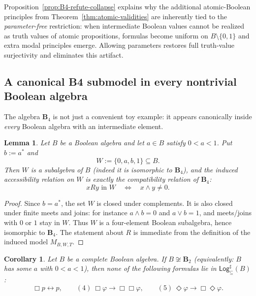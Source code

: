 \documentclass[11pt]{amsart}
\theoremstyle{definition}
\theoremstyle{plain}
\newtheorem{lemma}[definition]{Lemma}
\newtheorem{corollary}[definition]{Corollary}
\newcommand{\Btwo}{\mathbf{B}_2}
\newcommand{\Bfour}{\mathbf{B}_4}
\newcommand{\Logsub}{\mathsf{Log}_{\subseteq}^{\sharp}}
\begin{document}
Proposition~\ref{prop:B4-refute-collapse} explains why the additional atomic-Boolean principles from
Theorem~\ref{thm:atomic-validities} are inherently tied to the \emph{parameter-free} restriction:
when intermediate Boolean values cannot be realized as truth values of atomic propositions, formulas
become uniform on $B\setminus\{0,1\}$ and extra modal principles emerge. Allowing parameters restores
full truth-value surjectivity and eliminates this artifact.

\subsection{A canonical B4 submodel in every nontrivial Boolean algebra}\label{subsec:canonical-B4}

The algebra $\Bfour$ is not just a convenient toy example: it appears canonically inside \emph{every}
Boolean algebra with an intermediate element.

\begin{lemma}\label{lem:B4-inside-B}
Let $B$ be a Boolean algebra and let $a\in B$ satisfy $0<a<1$. Put $b:=a^\ast$ and
\[
W:=\{0,a,b,1\}\subseteq B.
\]
Then $W$ is a subalgebra of $B$ (indeed it is isomorphic to $\Bfour$), and the induced accessibility
relation on $W$ is exactly the compatibility relation of $\Bfour$:
\[
xRy \text{ in }W \quad\Longleftrightarrow\quad x\wedge y\neq 0.
\]
\end{lemma}

\begin{proof}
Since $b=a^\ast$, the set $W$ is closed under complements.
It is also closed under finite meets and joins: for instance $a\wedge b=0$ and $a\vee b=1$, and meets/joins
with $0$ or $1$ stay in $W$.
Thus $W$ is a four-element Boolean subalgebra, hence isomorphic to $\Bfour$.
The statement about $R$ is immediate from the definition of the induced model $M_{B,W,T}$.
\end{proof}

\begin{corollary}\label{ContainB4}
Let $B$ be a complete Boolean algebra.
If $B\not\cong \Btwo$ (equivalently: $B$ has some $a$ with $0<a<1$), then none of the following formulas lie in
$\Logsub(B)$:
\[
\Box p\leftrightarrow p,
\qquad
(4)\ \Box\varphi\to\Box\Box\varphi,
\qquad
(5)\ \Diamond\varphi\to\Box\Diamond\varphi.
\]
\end{corollary}
\end{document}
